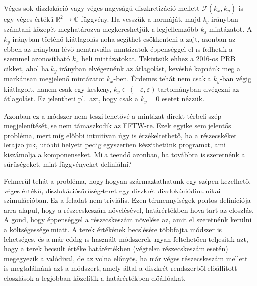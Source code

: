 \documentclass[10pt,a4paper]{scrartcl}
\begin{document}
Véges sok diszlokáció vagy véges nagyságú diszkretizáció mellett $\mathcal{F}\left( {{k_x},{k_y}} \right)$ is egy véges értékű ${\mathbb{R}^2} \to \mathbb{C}$ függvény. Ha vesszük a normáját, majd ${{k_y}}$ irányban számtani közepét meghatározva megkereshetjük a legjellemzőbb ${{k_x}}$ mintázatot. A $k_y$ irányban történő kiátlagolás noha segíthet csökkenteni a zajt, azonban az ebben az irányban lévő nemtriviális mintázatok éppenséggel el is fedhetik a szemmel azonosítható $k_x$ beli mintázatokat. Tekintsük ehhez a 2016-os PRB cikket, ahol ha $k_y$ irányban elvégeznénk az átlagolást, kevésbé kapnánk meg a markánsan megjelenő mintázatot $k_x$-ben. Érdemes tehát nem csak a $k_y$-ban végig kiátlagolt, hanem csak egy keskeny, ${k_y} \in \left( { - \varepsilon ,\varepsilon } \right)$ tartományban elvégezni az átlagolást. Ez jelentheti pl.\ azt, hogy csak a $k_y = 0$ esetet nézzük.

Azonban ez a módszer nem teszi lehetővé a mintázat direkt térbeli szép megjelenítését, se nem támaszkodik az FFTW-re. Ezek egyike sem jelentős probléma, mert míg előbbi intuitívan úgy is érzékeltethető, ha a részecskéket lerajzoljuk, utóbbi helyett pedig egyszerűen készíthetünk programot, ami kiszámolja a komponenseket. Mi a teendő azonban, ha továbbra is szeretnénk a sűrűségeket, mint függvényeket definiálni?

Felmerül tehát a probléma, hogy hogyan származtathatunk egy szépen kezelhető, véges értékű, diszlokációsűrűség-teret egy diszkrét diszlokációdinamikai szimulációban. Ez a feladat nem triviális. Ezen térmennyiségek pontos definíciója arra alapul, hogy a részecskeszám növelésével, határértékben hova tart az eloszlás. A gond, hogy éppenséggel a részecskeszám növelése az, amit el szeretnénk kerülni a költségessége miatt. A terek értékének becslésére többfajta módszer is lehetséges, és a már eddig is használt módszerek ugyan feltehetően teljesítik azt, hogy a terek becsült értéke határértékben (végtelen részecskeszám esetén) megegyezik a valódival, de az volna előnyös, ha már véges részecskeszám mellett is megtalálnánk azt a módszert, amely által a diszkrét rendszerből előállított eloszlások a legjobban közelítik a határértékben előállóakat.
\end{document}
